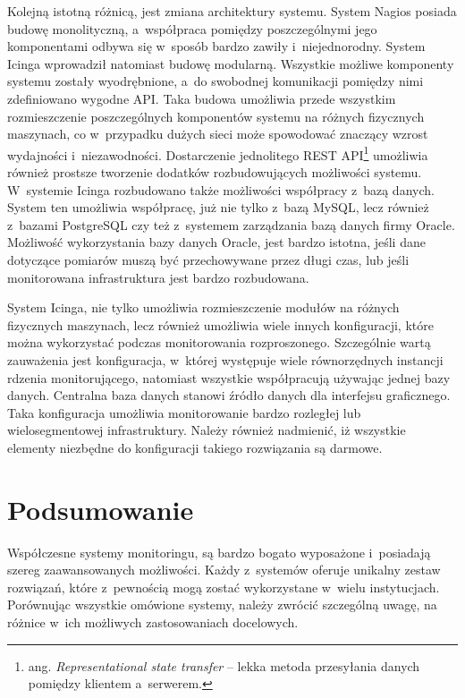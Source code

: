 Kolejną istotną różnicą, jest zmiana architektury systemu. System
Nagios posiada budowę monolityczną, a~współpraca pomiędzy
poszczególnymi jego komponentami odbywa się w~sposób bardzo zawiły
i~niejednorodny. System Icinga wprowadził natomiast budowę
modularną. Wszystkie możliwe komponenty systemu zostały wyodrębnione,
a~do swobodnej komunikacji pomiędzy nimi zdefiniowano wygodne
API. Taka budowa umożliwia przede wszystkim rozmieszczenie
poszczególnych komponentów systemu na różnych fizycznych maszynach, co
w~przypadku dużych sieci może spowodować znaczący wzrost wydajności
i~niezawodności. Dostarczenie jednolitego REST API\footnote{ang. {\em
    Representational state transfer} -- lekka metoda przesyłania
  danych pomiędzy klientem a~serwerem.} umożliwia również prostsze
tworzenie dodatków rozbudowujących możliwości systemu.  W~systemie
Icinga rozbudowano także możliwości współpracy z~bazą danych. System
ten umożliwia współpracę, już nie tylko z~bazą MySQL, lecz również
z~bazami PostgreSQL czy też z~systemem zarządzania bazą danych firmy
Oracle. Możliwość wykorzystania bazy danych Oracle, jest bardzo
istotna, jeśli dane dotyczące pomiarów muszą być przechowywane przez
długi czas, lub jeśli monitorowana infrastruktura jest bardzo
rozbudowana.

System Icinga, nie tylko umożliwia rozmieszczenie modułów na różnych
fizycznych maszynach, lecz również umożliwia wiele innych
konfiguracji, które można wykorzystać podczas monitorowania
rozproszonego. Szczególnie wartą zauważenia jest konfiguracja,
w~której występuje wiele równorzędnych instancji rdzenia
monitorującego, natomiast wszystkie współpracują używając jednej bazy
danych. Centralna baza danych stanowi źródło danych dla interfejsu
graficznego. Taka konfiguracja umożliwia monitorowanie bardzo rozległej
lub wielosegmentowej infrastruktury. Należy również nadmienić, iż
wszystkie elementy niezbędne do konfiguracji takiego rozwiązania są
darmowe.

\section[Podsumowanie][Podsumowanie]{Podsumowanie}

Współczesne systemy monitoringu, są bardzo bogato wyposażone
i~posiadają szereg zaawansowanych możliwości. Każdy z~systemów oferuje
unikalny zestaw rozwiązań, które z~pewnością mogą zostać wykorzystane
w~wielu instytucjach. Porównując wszystkie omówione systemy, należy
zwrócić szczególną uwagę, na różnice w~ich możliwych zastosowaniach
docelowych.

